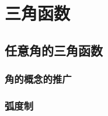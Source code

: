 \chapter{三角函数}
\section{任意角的三角函数}
\subsection{角的概念的推广}
\begin{Practice}
  \begin{question}
    \item 
    \item 
    \item 
    \item 
  \end{question}
\end{Practice}
\subsection{弧度制}
\begin{Practice}
  \begin{question}
    \item 
    \item 
    \item 
    \item 
    \item 
    \item 
    \item 
    \item 
    \item 
    \item 
  \end{question}
\end{Practice}

\begin{Exercise}
  \begin{question}
    \item 
    \item 
    \item 
    \item 
    \item 
    \item 
    \item 
    \item 
    \item 
    \item 
    \item 
    \item 
    \item 
    \item 
    \item 
    \item 
    \item 
    \item 
    \item 
  \end{question}
\end{Exercise}

